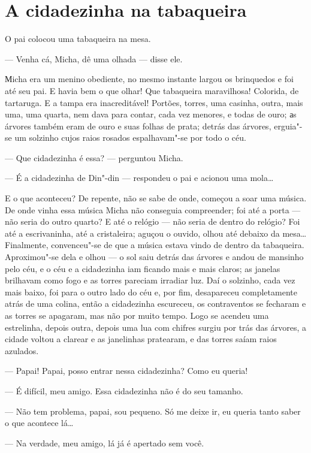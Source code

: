 \chapter{A cidadezinha na tabaqueira} \label{part2}

O pai colocou uma tabaqueira na mesa.

--- Venha cá, Micha, dê uma olhada --- disse ele.

Мicha era um menino obediente, no mesmo instante largou os brinquedos e
foi até seu pai. E havia bem o que olhar! Que tabaqueira maravilhosa!
Colorida, de tartaruga. E a tampa era inacreditável! Portões, torres,
uma casinha, outra, mais uma, uma quarta, nem dava para contar, cada vez
menores, e todas de ouro; аs árvores também eram de ouro e suas folhas
de prata; detrás das árvores, erguia"-se um solzinho cujos raios rosados
espalhavam"-se por todo o céu.

--- Que cidadezinha é essa? --- perguntou Micha.

--- É a cidadezinha de Din"-din --- respondeu o pai e acionou uma
mola\ldots{}

E o que aconteceu? De repente, não se sabe de onde, começou a soar uma
música. De onde vinha essa música Micha não conseguia compreender; foi
até a porta --- não seria do outro quarto? E até o relógio --- não seria
de dentro do relógio? Foi até a escrivaninha, até a cristaleira; aguçou
o ouvido, olhou até debaixo da mesa\ldots{} Finalmente, convenceu"-se de
que a música estava vindo de dentro da tabaqueira. Aproximou"-se dela e
olhou --- o sol saiu detrás das árvores e andou de mansinho pelo céu, e
o céu e a cidadezinha iam ficando mais e mais claros; as janelas
brilhavam como fogo e as torres pareciam irradiar luz. Daí o solzinho,
cada vez mais baixo, foi para o outro lado do céu e, por fim,
desapareceu completamente atrás de uma colina, então a cidadezinha
escureceu, os contraventos se fecharam e as torres se apagaram, mas não
por muito tempo. Logo se acendeu uma estrelinha, depois outra, depois
uma lua com chifres surgiu por trás das árvores, a cidade voltou a clarear e as janelinhas pratearam, e das torres saíam raios azulados.

--- Papai! Papai, posso entrar nessa cidadezinha? Como eu queria!

--- É difícil, meu amigo. Essa cidadezinha não é do seu tamanho.

--- Não tem problema, papai, sou pequeno. Só me deixe ir, eu queria
tanto saber o que acontece lá\ldots{}

--- Na verdade, meu amigo, lá já é apertado sem você.

